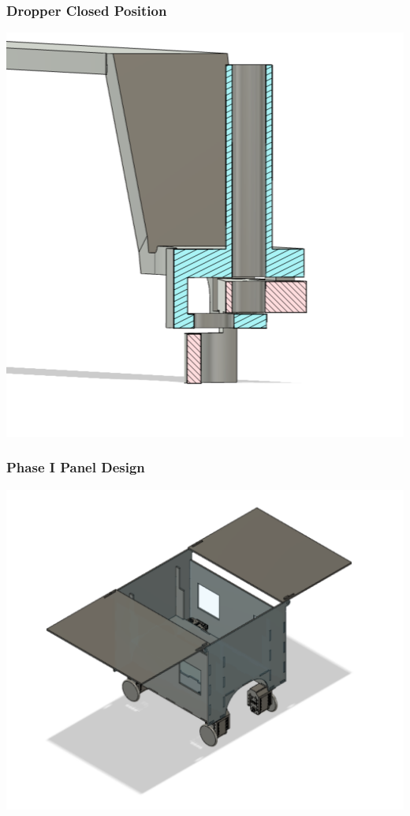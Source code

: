\documentclass[11pt, hidelinks]{report}
\begin{document}
\subsubsection{Dropper Closed Position} \label{app:dropclose}
	\begin{center}
	    \includegraphics[scale=.2]{dropclose.png}
	\end{center}
	
\subsubsection{Phase I Panel Design} \label{app:phaseone}
	\begin{center}
	    \includegraphics[scale=.4]{Originaldesign.png}
	\end{center}
	
\end{document}
